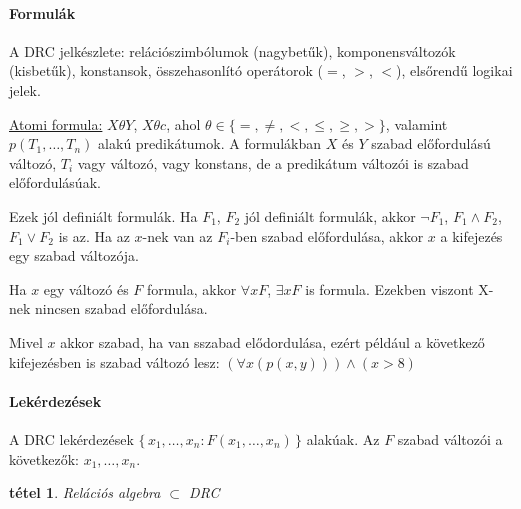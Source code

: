 \documentclass[fleqn,10pt,a4paper]{article}
\theoremstyle{magyar}
\newtheorem{te}{tétel}[section]
\begin{document}
  \paragraph{Formulák} A DRC jelkészlete: relációszimbólumok (nagybetűk), komponensváltozók (kisbetűk), konstansok,
  összehasonlító operátorok ($=$, $>$, $<$), elsőrendű logikai jelek.

  \underline{Atomi formula:} $X \theta Y$, $X \theta c$, ahol $\theta\in\{ =,\neq, <, \leq, \geq, >\}$, valamint
  $p(T_1,\ldots,T_n)$ alakú predikátumok. A formulákban $X$ és $Y$ szabad előfordulású változó, $T_i$ vagy változó, vagy
  konstans, de a predikátum változói is szabad előfordulásúak.

  Ezek jól definiált formulák. Ha $F_1$, $F_2$ jól definiált formulák, akkor $\lnot F_1$, $F_1\land F_2$, $F_1\lor F_2$
  is az. Ha az $x$-nek van az $F_i$-ben szabad előfordulása, akkor $x$ a kifejezés egy  szabad változója.

  Ha $x$ egy változó és $F$ formula, akkor $\forall x F$, $\exists x F$ is formula. Ezekben viszont X-nek nincsen szabad
  előfordulása.
  
  Mivel $x$ akkor szabad, ha van sszabad elődordulása, ezért például a következő kifejezésben is szabad változó lesz:
  $\left(\forall x\left(p\left(x,y\right)\right)\right)\land\left(x>8\right)$

  \paragraph{Lekérdezések} A DRC lekérdezések $\{\,x_1,\ldots,x_n : F(x_1,\ldots,x_n)\,\}$ alakúak. Az $F$ szabad
  változói a következők: $x_1,\ldots,x_n$.

  \begin{te}Relációs algebra $\subset$ DRC
  \end{te}
  
\end{document}
